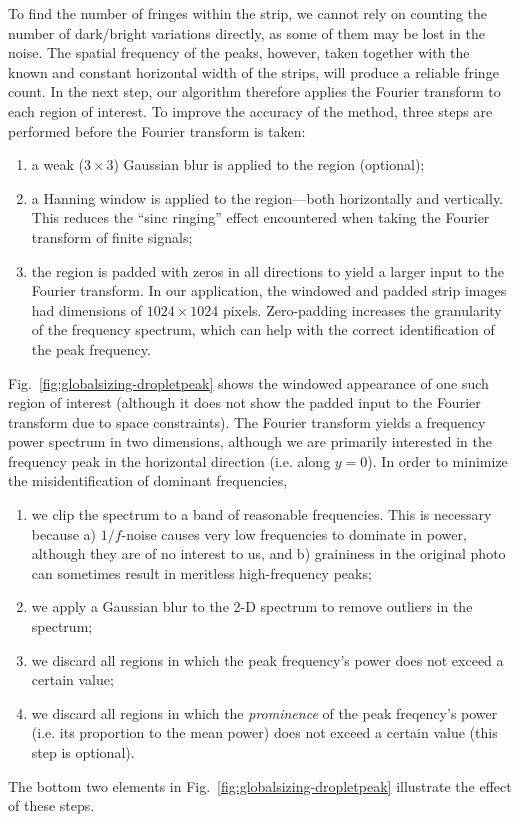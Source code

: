 \documentclass[11.5pt,oneside]{book}
\newcommand*{\figref}[1]{Fig.~\ref{#1}}
\begin{document}
To find the number of fringes within the strip, we cannot rely on counting the
number of dark/bright variations directly, as some of them may be lost in the
noise. The spatial frequency of the peaks, however, taken together with the
known and constant horizontal width of the strips, will produce a reliable
fringe count. In the next step, our algorithm therefore applies the Fourier
transform to each region of interest. To improve the accuracy of the method,
three steps are performed before the Fourier transform is taken:
\begin{enumerate}
    \item a weak ($3 \times 3$) Gaussian blur is applied to the region
        (optional);
    \item a Hanning window is applied to the region---both horizontally and
        vertically. This reduces the ``sinc ringing'' effect encountered when
        taking the Fourier transform of finite signals;
    \item the region is padded with zeros in all directions to yield a larger
        input to the Fourier transform. In our application, the windowed and padded strip
        images had dimensions of $1024 \times 1024$ pixels. Zero-padding
        increases the granularity of the frequency spectrum, which can help with
        the correct identification of the peak frequency.
\end{enumerate}

\figref{fig:globalsizing-dropletpeak} shows the windowed appearance of
one such region of interest (although it does not show the padded input to the
Fourier transform due to space constraints). The Fourier transform yields a
frequency power spectrum in two dimensions, although we are primarily interested
in the frequency peak in the horizontal direction (i.e. along $y=0$). In order
to minimize the misidentification of dominant frequencies,
\begin{enumerate}
    \item we clip the spectrum to a band of reasonable frequencies. This is
        necessary because a) $1/f$-noise causes very low frequencies to dominate
        in power, although they are of no interest to us, and b) graininess in
        the original photo can sometimes result in meritless high-frequency
        peaks;
    \item we apply a Gaussian blur to the 2-D spectrum to remove outliers in the
        spectrum;
    \item we discard all regions in which the peak frequency's power does not
        exceed a certain value;
    \item we discard all regions in which the \textit{prominence} of the peak
        freqency's power (i.e. its proportion to the mean power) does not exceed
        a certain value (this step is optional).
\end{enumerate}
The bottom two elements in \figref{fig:globalsizing-dropletpeak} illustrate
the effect of these steps.
\end{document}

